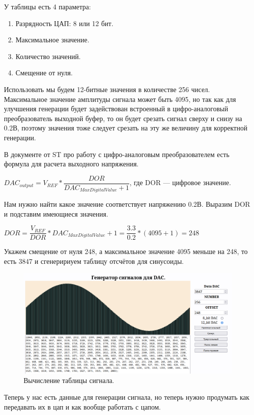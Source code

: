 	У таблицы есть 4 параметра:
	\begin{enumerate}
		\item Разрядность ЦАП: 8 или 12 бит.
		\item Максимальное значение.
		\item Количество значений.
		\item Смещение от нуля.
	\end{enumerate}
	
	Использовать мы будем 12-битные значения в количестве 256 чисел. Максимальное значение амплитуды сигнала может быть 4095, но так как для улучшения генерации будет задействован встроенный в цифро-аналоговый преобразователь выходной буфер, то он будет срезать сигнал сверху и снизу на 0.2В, поэтому значения тоже следует срезать на эту же величину для корректной генерации.
	
	В документе от ST про работу с цифро-аналоговым преобразователем есть формула для расчета выходного напряжения.
	
	$DAC_{output} = V_{REF}*\dfrac{DOR}{DAC_{MaxDigitalValue} + 1}$, где DOR --- цифровое значение.
	
	Нам нужно найти какое значение соответствует напряжению 0.2В. Выразим DOR и подставим имеющиеся значения.
	
	$DOR = \dfrac{V_{REF}}{DOR}*DAC_{MaxDigitalValue} + 1 = \dfrac{3.3}{0.2}*(4095+1) = 248$
	
	Укажем смещение от нуля 248, а максимальное значение 4095 меньше на 248, то есть 3847 и сгенеририуем таблицу отсчётов для синусоиды. 
	
	\begin{figure}[H]
    \centering
    \includegraphics[width=1\textwidth]{../image/lut.png}
    \caption{Вычисление таблицы сигнала.}
	\end{figure}
	
	Теперь у нас есть данные для генерации сигнала, но теперь нужно продумать как передавать их в цап и как вообще работать с цапом.